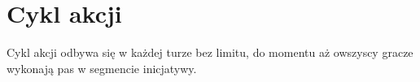 \section{Cykl akcji}
Cykl akcji odbywa się w każdej turze bez limitu, do momentu aż owszyscy gracze wykonają pas w segmencie inicjatywy.